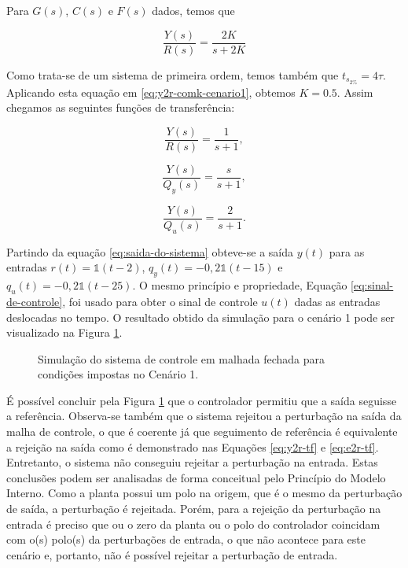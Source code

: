 Para $G(s)$, $C(s)$ e $F(s)$ dados, temos que

\begin{equation}
    \label{eq:y2r-comk-cenario1}
    \frac{Y(s)}{R(s)} = \frac{2K}{s + 2K}
\end{equation}

Como trata-se de um sistema de primeira ordem, temos também que $t_{s_{2\%}} =
4\tau$. Aplicando esta equação em \ref{eq:y2r-comk-cenario1}, obtemos $K = 0.5$.
Assim chegamos as seguintes funções de transferência:

\begin{equation}
    \label{eq:y2r-cenario1}
    \frac{Y(s)}{R(s)} = \frac{1}{s + 1},
\end{equation}

\begin{equation}
    \label{eq:y2qy-cenario1}
    \frac{Y(s)}{Q_{y}(s)} = \frac{s}{s + 1},
\end{equation}

\begin{equation}
    \label{eq:y2qu-cenario1}
    \frac{Y(s)}{Q_{u}(s)} = \frac{2}{s + 1}.
\end{equation}

Partindo da equação \ref{eq:saida-do-sistema} obteve-se a saída $y(t)$ para as
entradas $r(t) = \mathds{1}(t - 2)$, $q_{y}(t) = -0,2\mathds{1}(t - 15)$
e $q_{u}(t) = -0,2\mathds{1}(t - 25)$. O mesmo princípio e propriedade, Equação
\ref{eq:sinal-de-controle}, foi usado para obter o sinal de controle $u(t)$
dadas as entradas deslocadas no tempo. O resultado obtido da simulação para o
cenário 1 pode ser visualizado na Figura \ref{fig:resultado-cenario1}.

\begin{figure}[!ht]
    \caption{Simulação do sistema de controle em malhada fechada para condições
    impostas no Cenário 1.}
    \vspace{-10pt}
    \hspace{-30pt}
    \label{fig:resultado-cenario1}
    \begin{minipage}{\linewidth}
        
    \end{minipage}
\end{figure}

É possível concluir pela Figura \ref{fig:resultado-cenario1} que o
controlador permitiu que a saída seguisse a referência. Observa-se também que o
sistema rejeitou a perturbação na saída da malha de controle, o que é coerente
já que seguimento de referência é equivalente a rejeição na saída como é
demonstrado nas Equações \ref{eq:y2r-tf} e \ref{eq:e2r-tf}. Entretanto, o
sistema não conseguiu rejeitar a perturbação na entrada. Estas conclusões
podem ser analisadas de forma conceitual pelo Princípio do Modelo Interno. Como
a planta possui um polo na origem, que é o mesmo da perturbação de saída, a
perturbação é rejeitada. Porém, para a rejeição da perturbação na entrada é
preciso que ou o zero da planta ou o polo do controlador coincidam com o(s)
polo(s) da perturbações de entrada, o que não acontece para este cenário e,
portanto, não é possível rejeitar a perturbação de entrada.

